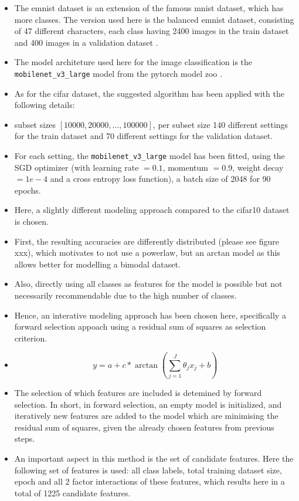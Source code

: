 \documentclass{article} %
\begin{document}
\begin{itemize}
    \item The emnist dataset is an extension of the famous mnist dataset, which has more classes. The version used here is the balanced emnist dataset, consisting of 47 different characters, each class having 2400 images in the train dataset and 400 images in a validation dataset \cite{cohen2017emnist}.  
    \item The model architeture used here for the image classification is the \verb|mobilenet_v3_large| model from the pytorch model zoo \cite{howard2019mobilenetv3}.
    \item As for the cifar dataset, the suggested algorithm has been applied with the following details:
    \item subset sizes $[10000, 20000, \dots, 100000]$, per subset size 140 different settings for the train dataset and 70 different settings for the validation dataset.
    \item For each setting, the \verb|mobilenet_v3_large| model has been fitted, using the SGD optimizer (with learning rate $=0.1$, momentum $=0.9$, weight decay $=1e-4$ and a cross entropy loss function), a batch size of 2048 for 90 epochs. 
    \item Here, a slightly different modeling approach compared to the cifar10 dataset is chosen. 
    \item First, the resulting accuracies are differently distributed (please see figure xxx), which motivates to not use a powerlaw, but an arctan model as this allows better for modelling a bimodal dataset.
    \item Also, directly using all classes as features for the model is possible but not necessarily recommendable due to the high number of classes.
    \item Hence, an interative modeling approach has been chosen here, specifically a forward selection appoach using a residual sum of squares as selection criterion. 
    \item $$y = a + c* \arctan{\left(\sum_{j = 1}^{J}{\theta_j x_j} + b \right)}$$
    \item The selection of which features are included is detemined by forward selection. In short, in forward selection, an empty model is initialized, and iteratively new features are added to the model which are minimising the residual sum of squares, given the already chosen features from previous steps.
    \item An important aspect in this method is the set of candidate features. Here the following set of features is used: all class labels, total training dataset size, epoch and all 2 factor interactions of these features, which results here in a total of 1225 candidate features.

\end{itemize}
\end{document}
